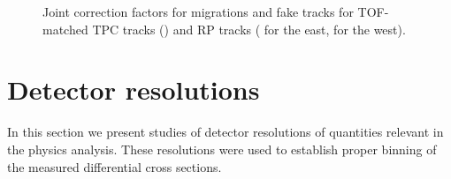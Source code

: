 \begin{figure}
{}
\quad
\parbox{0.315\textwidth}{
  \centering
  \begin{subfigure}[b]{\linewidth}{
                }
  \end{subfigure}
}%
\caption[Joint corrections for migrations and fake tracks for TPC and RP tracks.]{Joint correction factors for migrations and fake tracks for TOF-matched TPC tracks () and RP tracks ( for the east,  for the west).} \label{fig:migrationsAndFakesCorr}
\end{figure}




\section{Detector resolutions}\label{sec:resolutions}

In this section we present studies of detector resolutions of quantities relevant in the physics analysis. These resolutions were used to establish proper binning of the measured differential cross sections.


